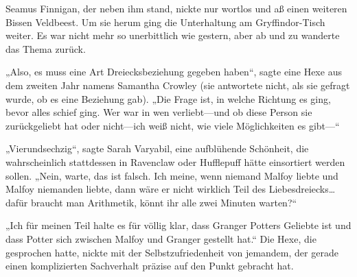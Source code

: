 
Seamus Finnigan, der neben ihm stand, nickte nur wortlos und aß einen weiteren Bissen Veldbeest. Um sie herum ging die Unterhaltung am Gryffindor-Tisch weiter. Es war nicht mehr so unerbittlich wie gestern, aber ab und zu wanderte das Thema zurück.

„Also, es muss eine Art Dreiecksbeziehung gegeben haben“, sagte eine Hexe aus dem zweiten Jahr namens Samantha Crowley (sie antwortete nicht, als sie gefragt wurde, ob es eine Beziehung gab). „Die Frage ist, in welche Richtung es ging, bevor alles schief ging. Wer war in wen verliebt—und ob diese Person sie zurückgeliebt hat oder nicht—ich weiß nicht, wie viele Möglichkeiten es gibt—“

„Vierundsechzig“, sagte Sarah Varyabil, eine aufblühende Schönheit, die wahrscheinlich stattdessen in Ravenclaw oder Hufflepuff hätte einsortiert werden sollen. „Nein, warte, das ist falsch. Ich meine, wenn niemand Malfoy liebte und Malfoy niemanden liebte, dann wäre er nicht wirklich Teil des Liebesdreiecks…dafür braucht man Arithmetik, könnt ihr alle zwei Minuten warten?“

„Ich für meinen Teil halte es für völlig klar, dass Granger Potters Geliebte ist und dass Potter sich zwischen Malfoy und Granger gestellt hat.“ Die Hexe, die gesprochen hatte, nickte mit der Selbstzufriedenheit von jemandem, der gerade einen komplizierten Sachverhalt präzise auf den Punkt gebracht hat.

